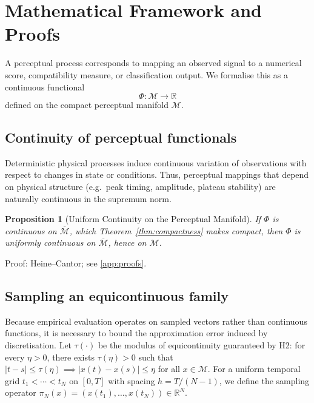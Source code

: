 \documentclass[10pt]{article}
\theoremstyle{plain}
\newtheorem{proposition}[theorem]{Proposition}
\theoremstyle{definition}
\theoremstyle{remark}
\begin{document}
\appendix

\appendix


\section{Mathematical Framework and Proofs}\label{app:math_framework}


\label{sec:uat-section}

A perceptual process corresponds to mapping an observed signal to a numerical 
score, compatibility measure, or classification output. We formalise this as a 
continuous functional
\[
\Phi : \mathcal{M} \to \mathbb{R}
\]
defined on the compact perceptual manifold $\mathcal{M}$.

\subsection{Continuity of perceptual functionals}

Deterministic physical processes induce continuous variation of observations with
respect to changes in state or conditions. Thus, perceptual mappings that depend 
on physical structure (e.g.\ peak timing, amplitude, plateau stability) are 
naturally continuous in the supremum norm.

\begin{proposition}[Uniform Continuity on the Perceptual Manifold]
\label{prop:uniform}
If $\Phi$ is continuous on $\overline{\mathcal{M}}$, which
Theorem~\ref{thm:compactness} makes compact, then $\Phi$ is uniformly
continuous on $\overline{\mathcal{M}}$, hence on $\mathcal{M}$.
\end{proposition}

\noindent Proof: Heine–Cantor; see \ref{app:proofs}.

\subsection{Sampling an equicontinuous family}
\label{sec:sampling-lemma}

Because empirical evaluation operates on sampled vectors rather than continuous
functions, it is necessary to bound the approximation error induced by
discretisation. Let $\tau(\cdot)$ be the modulus of equicontinuity guaranteed
by H2: for every $\eta>0$, there exists $\tau(\eta)>0$ such that
$|t-s| \le \tau(\eta) \implies |x(t)-x(s)| \le \eta$ for all $x \in \mathcal{M}$.
For a uniform temporal grid $t_1 < \cdots < t_N$ on $[0,T]$ with spacing
$h = T/(N-1)$, we define the sampling operator
$\pi_N(x) = (x(t_1),\dots,x(t_N)) \in \mathbb{R}^N$.
\end{document}
